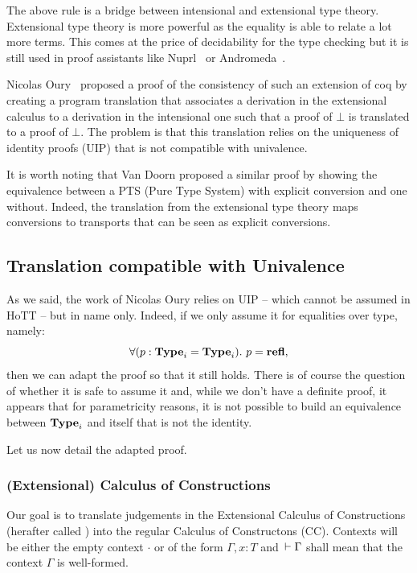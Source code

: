 \documentclass[11pt]{article}
\theoremstyle{plain}
\theoremstyle{remark}
\begin{document}
\begin{mathc}
\end{mathc}
%
The above rule is a bridge between intensional and extensional type theory.
Extensional type theory is more powerful as the equality is able to relate a lot
more terms. This comes at the price of decidability for the type checking but it
is still used in proof assistants like Nuprl~\cite{constableimplementing} or
Andromeda~\cite{andromeda}.

Nicolas Oury~\cite{oury2005extensionality} proposed a proof of the consistency
of such an extension of coq by creating a program translation that associates a
derivation in the extensional calculus to a derivation in the intensional one
such that a proof of $\bot$ is translated to a proof of $\bot$.
The problem is that this translation relies on the uniqueness of identity
proofs (UIP) that is not compatible with univalence.

It is worth noting that Van Doorn \etal \cite{van2013explicit} proposed a
similar proof by showing the equivalence between a PTS (Pure Type System) with
explicit conversion and one without. Indeed, the translation from the
extensional type theory maps conversions to transports that can be seen as
explicit conversions.

\subsection{Translation compatible with Univalence}

As we said, the work of Nicolas Oury relies on UIP -- which cannot be assumed in
HoTT -- but in name only. Indeed, if we only assume it for equalities over
type, namely:
\[ \forall (p : \operatorname{\mathbf{Type}}_i = \operatorname{\mathbf{Type}}_i).\ p = \operatorname{\mathbf{refl}}, \]
then we can adapt the proof so that it still holds.
There is of course the question of whether it is safe to assume it and, while
we don't have a definite proof, it appears that for parametricity reasons,
it is not possible to build an equivalence between $\operatorname{\mathbf{Type}}_i$ and itself that
is not the identity.

Let us now detail the adapted proof.

\subsubsection{(Extensional) Calculus of Constructions}

Our goal is to translate judgements in the Extensional Calculus of
Constructions (herafter called \CCe) into the regular Calculus of Constructons
(CC). Contexts will be either the empty context $\cdot$ or of the form
$\Gamma, x:T$ and $\,\vdash \Gamma$ shall mean that the context $\Gamma$ is
well-formed.
\end{document}
